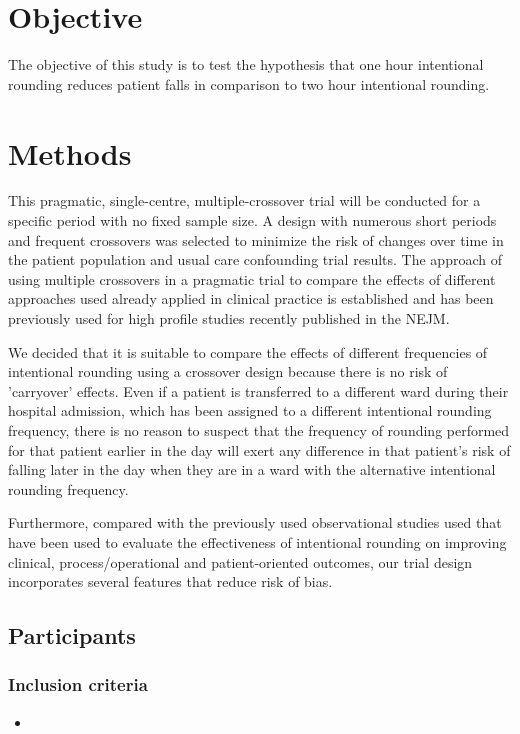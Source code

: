 \documentclass[12pt]{article}
\begin{document}
\section{Objective}
The objective of this study is to test the hypothesis that one hour intentional rounding reduces patient falls in comparison to two hour intentional rounding. 

\section{Methods}

This pragmatic, single-centre, multiple-crossover trial will be conducted for a specific period with no fixed sample size. A design with numerous short periods and frequent crossovers was selected to minimize the risk of changes over time in the patient population and usual care confounding trial results. The approach of using multiple crossovers in a pragmatic trial to compare the effects of different approaches used already applied in clinical practice is established and has been previously used for high profile studies recently published in the NEJM.\cite{self2018} 


We decided that it is suitable to compare the effects of different frequencies of intentional rounding using a crossover design because there is no risk of 'carryover' effects. Even if a patient is transferred to a different ward during their hospital admission, which has been assigned to a different intentional rounding frequency, there is no reason to suspect that the frequency of rounding performed for that patient earlier in the day will exert any difference in that patient's risk of falling later in the day when they are in a ward with the alternative intentional rounding frequency.  

Furthermore, compared with the previously used observational studies used that have been used to evaluate the effectiveness of intentional rounding on improving clinical, process/operational and patient-oriented outcomes, our trial design incorporates several features that reduce risk of bias. 

\subsection{Participants}
\subsubsection{Inclusion criteria}
\begin{itemize}
    \item 
\end{itemize}
\end{document}

